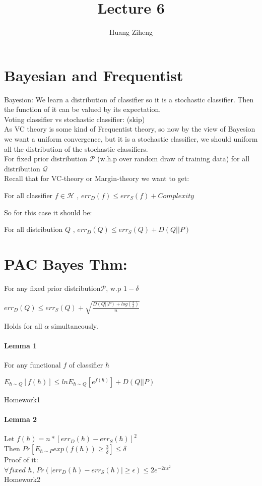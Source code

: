 \documentclass{article}
\author{Huang Ziheng}
\title{Lecture 6}
\begin{document}
\maketitle
\section{Bayesian and Frequentist}
Bayesion: We learn a distribution of classifier so it is a stochastic classifier. Then the function of it can be valued by its expectation.
\\Voting classifier vs stochastic classifier: (skip)
\\As VC theory is some kind of Frequentist theory, so now by the view of Bayesion we want a uniform convergence, but it is a stochastic classifier, we should uniform all the distribution of the stochastic classifiers.
\\For fixed prior distribution $\mathcal{P}$ (w.h.p over random draw of training data) for all distribution $\mathcal{Q}$
\\Recall that for VC-theory or Margin-theory we want to get:
\begin{center}
For all classifier $f\in\mathcal{H}$ , $err_D(f)\leq err_S(f)+Complexity$
\end{center}
So for this case it should be:
\begin{center}
For all distribution $Q$ , $err_D(Q)\leq err_S(Q)+D(Q||P)$
\end{center}

\section{PAC Bayes Thm:}
For any fixed prior distribution$\mathcal{P}$, w.p $1-\delta$
\begin{center}
$err_D(Q)\leq err_S(Q)+\sqrt{\frac{D(Q||P)+log(\frac{3}{\delta})}{n}}$
\end{center}
Holds for all $\alpha$ simultaneously.
\paragraph{Lemma 1}
For any functional $f$ of classifier $\hbar$
\begin{center}
$E_{\hbar\sim Q}[f(\hbar)]\leq ln E_{\hbar\sim Q}[e^{f(\hbar)}]+D(Q||P)$
\end{center}
Homework1
\paragraph{Lemma 2}
Let $f(\hbar)=n*[err_D(\hbar)-err_S(\hbar)]^2$
\\Then $Pr[E_{\hbar\sim P}exp(f(\hbar))\geq\frac{3}{\delta}]\leq\delta$
\\Proof of it:
\\$\forall fixed$ $\hbar$, $Pr(|err_D(\hbar)-err_S(\hbar)|\geq\epsilon)\leq 2e^{-2n\epsilon^2}$
\\Homework2
\end{document}
